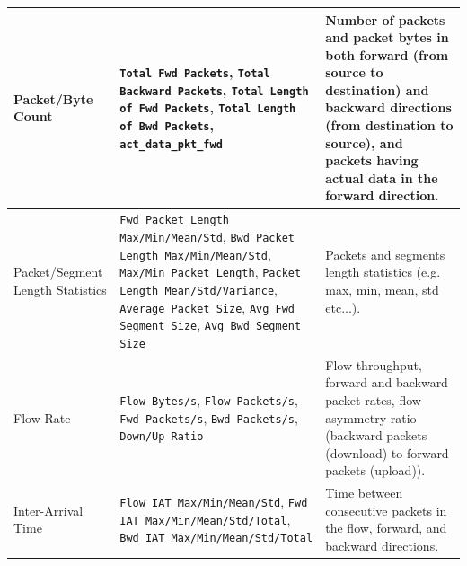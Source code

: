 \begin{longtable}{|p{4cm}|p{6cm}|p{6cm}|}
    \hline
    Packet/Byte Count                                                                                                                                                                                                                                                                                      &
    \texttt{Total Fwd Packets}, \texttt{Total Backward Packets}, \texttt{Total Length of Fwd Packets}, \texttt{Total Length of Bwd Packets}, \texttt{act\_data\_pkt\_fwd}                                                                                                                                  & Number of packets and packet bytes in both forward (from source to destination) and backward directions (from destination to source), and packets having actual data in the forward direction.                                                                                   \\
    \hline
    Packet/Segment Length Statistics                                                                                                                                                                                                                                                                       &
    \texttt{Fwd Packet Length Max/Min/Mean/Std}, \texttt{Bwd Packet Length Max/Min/Mean/Std}, \texttt{Max/Min Packet Length}, \texttt{Packet Length Mean/Std/Variance}, \texttt{Average Packet Size}, \texttt{Avg Fwd Segment Size}, \texttt{Avg Bwd Segment Size}                                         & Packets and segments length statistics (e.g. max, min, mean, std etc...).
    \\
    \hline
    Flow Rate                                                                                                                                                                                                                                                                                              &
    \texttt{Flow Bytes/s}, \texttt{Flow Packets/s}, \texttt{Fwd Packets/s}, \texttt{Bwd Packets/s}, \texttt{Down/Up Ratio}                                                                                                                                                                                 & Flow throughput, forward and backward packet rates, flow asymmetry ratio (backward packets (download) to forward packets (upload)).
    \\
    \hline
    Inter-Arrival Time                                                                                                                                                                                                                                                                                     & \texttt{Flow IAT Max/Min/Mean/Std}, \texttt{Fwd IAT Max/Min/Mean/Std/Total}, \texttt{Bwd IAT Max/Min/Mean/Std/Total}                                                                           & Time between consecutive packets in the flow, forward, and backward directions.

\end{longtable}
